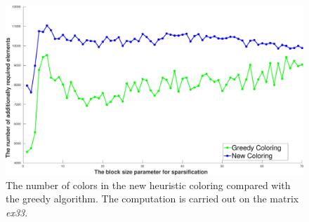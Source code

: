 \documentclass[11pt, twoside,a4paper]{book}
\begin{document}
\begin{figure}
\centering
\includegraphics[width=0.9\linewidth]{bls_adds_ex33_without_alpha}
\caption{The number of colors in the new heuristic coloring compared with the greedy algorithm.
The computation is carried out on the matrix \textit{ex33}. }
\label{bls_adds_ex33_without_alpha}
\end{figure}
\end{document}
